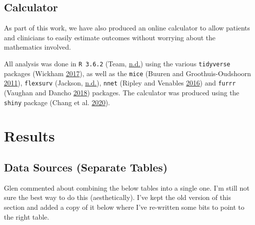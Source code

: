 \documentclass[
]{article}
\begin{document}
\hypertarget{calculator}{%
\subsection{Calculator}\label{calculator}}

As part of this work, we have also produced an online calculator to allow patients and clinicians to easily estimate outcomes without worrying about the mathematics involved.

All analysis was done in \texttt{R\ 3.6.2} (Team, \protect\hyperlink{ref-r_core_team_r_nodate}{n.d.}) using the various \texttt{tidyverse} packages (Wickham \protect\hyperlink{ref-wickham_tidy_2017}{2017}), as well as the \texttt{mice} (Buuren and Groothuis-Oudshoorn \protect\hyperlink{ref-buuren_mice_2011-1}{2011}), \texttt{flexsurv} (Jackson, \protect\hyperlink{ref-jackson_flexsurv_nodate}{n.d.}), \texttt{nnet} (Ripley and Venables \protect\hyperlink{ref-ripley_package_2016}{2016}) and \texttt{furrr} (Vaughan and Dancho \protect\hyperlink{ref-vaughan_furrr_2018}{2018}) packages. The calculator was produced using the \texttt{shiny} package (Chang et al. \protect\hyperlink{ref-chang_shiny_2020}{2020}).

\hypertarget{results-1}{%
\section{Results}\label{results-1}}

\hypertarget{data-sources-separate-tables}{%
\subsection{Data Sources (Separate Tables)}\label{data-sources-separate-tables}}

Glen commented about combining the below tables into a single one. I'm still not sure the best way to do this (aesthetically). I've kept the old version of this section and added a copy of it below where I've re-written some bits to point to the right table.
\end{document}
